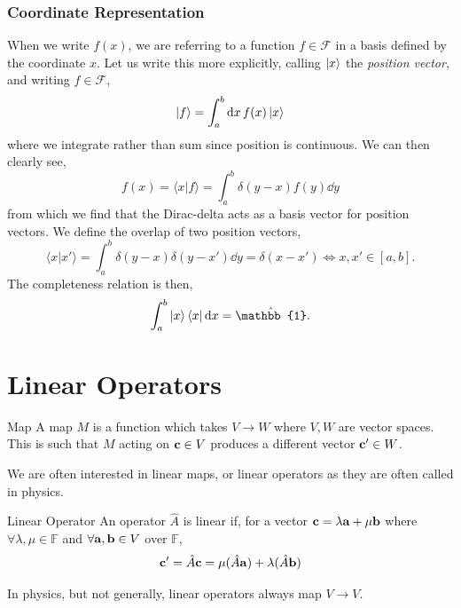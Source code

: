 \documentclass{book}
\renewcommand{\braket}[2]{\langle#1|#2\rangle}
\begin{document}
\subsection{Coordinate Representation}
When we write $f(x)$, we are referring to a function $f \in \mathcal{F}$ in a basis defined by the coordinate $x$. Let us write this more explicitly, calling $\ket{x}$ the \textit{position vector}, and writing $f \in \mathcal{F}$,
\begin{equation}
	\ket{f} = \int_a^b\dd{x}f(x)\ket{x}
\end{equation}
where we integrate rather than sum since position is continuous. We can then clearly see,
\begin{equation}
	f(x) = \braket{x}{f} = \int_a^b\delta(y-x)f(y)\dd{y}
\end{equation}
from which we find that the Dirac-delta acts as a basis vector for position vectors. We define the overlap of two position vectors,
\begin{equation}
	\braket{x}{x'} = \int_a^b\delta(y-x)\delta(y-x')\dd{y} = \delta(x-x') \iff x,x'\in\left[a,b\right].
\end{equation}
The completeness relation is then,
\begin{equation}
	\int_a^b\ket{x}\bra{x}\dd{x} = \hat{\mathbb{1}}.
\end{equation}
\chapter{Linear Operators}
\begin{Definitions}{Map}{}
	A map $M$ is a function which takes $V \to W$ where $V,W$ are vector spaces. This is such that $M$ acting on $\vb{c} \in V$ produces a different vector $\vb{c}' \in W$.
\end{Definitions}
We are often interested in linear maps, or linear operators as they are often called in physics.
\begin{Definitions}{Linear Operator}{}
	An operator $\hat{A}$ is linear if, for a vector $\vb{c} = \lambda \vb{a} + \mu\vb{b}$ where $\forall \lambda, \mu \in \mathbb{F}$ and $\forall \vb{a},\vb{b} \in V$ over $\mathbb{F}$, 
	\begin{equation}
		\vb{c}' = \hat{A}\vb{c} = \mu(\hat{A}\vb{a})+ \lambda (\hat{A}\vb{b})
	\end{equation}
\end{Definitions}
In physics, but not generally, linear operators always map $V \to V$.
\end{document}
